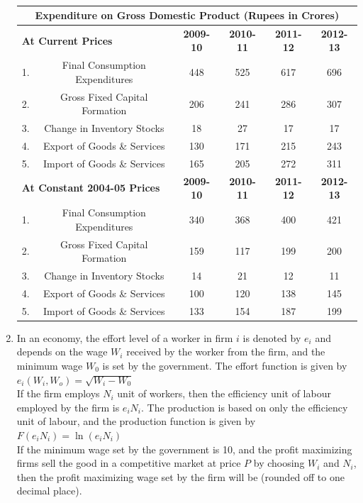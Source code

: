 \documentclass{article}
\begin{document}
\begin{enumerate}[leftmargin=*, start=45, label=Q.\arabic*.]
    \begin{table}[ht]
    \centering 
    \begin{tabular}{|c|c|c|c|c|c|}
    \hline
    \multicolumn{6}{|c|}{\textbf{Expenditure on Gross Domestic Product (Rupees in Crores)}} \\
    \hline
    \multicolumn{2}{|l|}{\textbf{At Current Prices}} & \textbf{2009-10} & \textbf{2010-11} & \textbf{2011-12} & \textbf{2012-13} \\ \hline
    1. & Final Consumption Expenditures        & 448 & 525 & 617 & 696 \\ \hline
    2. & Gross Fixed Capital Formation         & 206 & 241 & 286 & 307 \\ \hline
    3. & Change in Inventory Stocks            & 18  & 27  & 17  & 17  \\ \hline
    4. & Export of Goods \& Services           & 130 & 171 & 215 & 243 \\ \hline
    5. & Import of Goods \& Services           & 165 & 205 & 272 & 311 \\ \hline
    \multicolumn{2}{|l|}{\textbf{At Constant 2004-05 Prices}} & \textbf{2009-10} & \textbf{2010-11} & \textbf{2011-12} & \textbf{2012-13} \\ \hline
    1. & Final Consumption Expenditures        & 340 & 368 & 400 & 421 \\ \hline
    2. & Gross Fixed Capital Formation         & 159 & 117 & 199 & 200 \\ \hline
    3. & Change in Inventory Stocks            & 14  & 21  & 12  & 11  \\ \hline
    4. & Export of Goods \& Services           & 100 & 120 & 138 & 145 \\ \hline
    5. & Import of Goods \& Services           & 133 & 154 & 187 & 199 \\ \hline
    \end{tabular}
    \caption{}
    \end{table}

    \item In an economy, the effort level of a worker in firm $i$ is denoted by $e_i$ and depends on the wage $W_i$ received by the worker from the firm, and the minimum wage $W_0$ is set by the government. The effort function is given by \\ $e_i(W_i,W_o)=\sqrt{W_i-W_0}$ \\ If the firm employs $N_i$ unit of workers, then the efficiency unit of labour employed by the firm is $e_iN_i$. The production is based on only the efficiency unit of labour, and the production function is given by \\ $F(e_iN_i)=\ln(e_iN_i)$ \\ If the minimum wage set by the government is 10, and the profit maximizing firms sell the good in a competitive market at price $P$ by choosing $W_i$ and $N_i$, then the profit maximizing wage set by the firm will be \makebox[1cm]{\hrulefill} (rounded off to one decimal place).


\end{enumerate}
\end{document}
